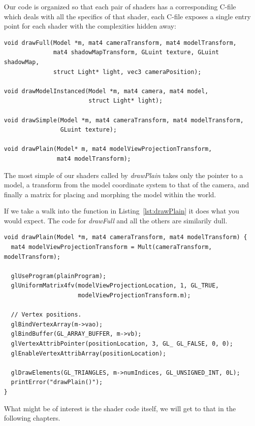 \documentclass[a4paper,12pt]{article}
\begin{document}
Our code is organized so that each pair of shaders has a corresponding C-file which deals with all the specifics of that shader, each C-file exposes a single entry point for each shader with the complexities hidden away:

\begin{lstlisting}[label=lst:entry-points,caption= The entry points of each shader pair\, listed in decreasing complexity.]
void drawFull(Model *m, mat4 cameraTransform, mat4 modelTransform,
              mat4 shadowMapTransform, GLuint texture, GLuint shadowMap,
              struct Light* light, vec3 cameraPosition);

void drawModelInstanced(Model *m, mat4 camera, mat4 model,
                        struct Light* light);

void drawSimple(Model *m, mat4 cameraTransform, mat4 modelTransform,
                GLuint texture);

void drawPlain(Model* m, mat4 modelViewProjectionTransform,
               mat4 modelTransform);
\end{lstlisting}

The most simple of our shaders called by \emph{drawPlain} takes only the pointer to a model, a transform from the model coordinate system to that of the camera, and finally a matrix for placing and morphing the model within the world.

If we take a walk into the function in Listing~\ref{lst:drawPlain} it does what you would expect. The code for \emph{drawFull} and all the others are similarily dull.

\begin{lstlisting}[label=lst:drawPlain,caption= The contents of the drawPlain function.]
void drawPlain(Model *m, mat4 cameraTransform, mat4 modelTransform) {
  mat4 modelViewProjectionTransform = Mult(cameraTransform, modelTransform);

  glUseProgram(plainProgram);
  glUniformMatrix4fv(modelViewProjectionLocation, 1, GL_TRUE,
                     modelViewProjectionTransform.m);

  // Vertex positions.
  glBindVertexArray(m->vao);
  glBindBuffer(GL_ARRAY_BUFFER, m->vb);
  glVertexAttribPointer(positionLocation, 3, GL_ GL_FALSE, 0, 0);
  glEnableVertexAttribArray(positionLocation);

  glDrawElements(GL_TRIANGLES, m->numIndices, GL_UNSIGNED_INT, 0L);
  printError("drawPlain()");
}
\end{lstlisting}

What might be of interest is the shader code itself, we will get to that in the following chapters.
\end{document}
